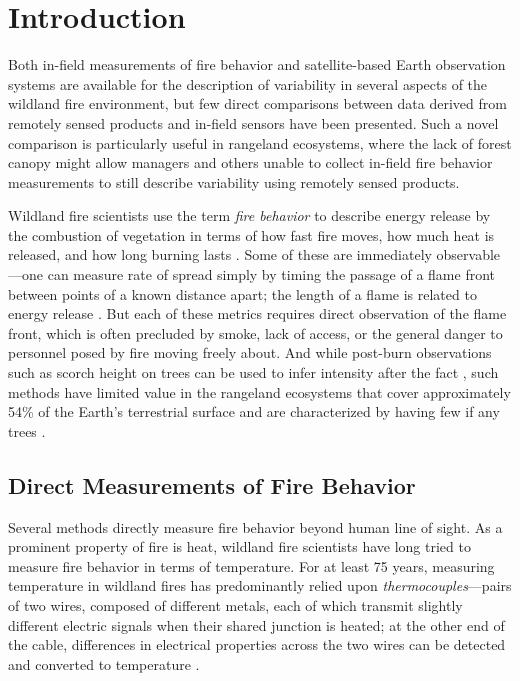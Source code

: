 \documentclass[fire,article,accept,oneauthor,pdftex]{Definitions/mdpi}
\begin{document}
\section{Introduction}

Both in-field measurements of fire behavior and satellite-based Earth observation systems are available for the description of variability in several aspects of the wildland fire environment, but few direct comparisons between data derived from remotely sensed products and in-field sensors have been presented. 
Such a novel comparison is particularly useful in rangeland ecosystems, where the lack of forest canopy might allow managers and others unable to collect in-field fire behavior measurements to still describe variability using remotely sensed products.  

Wildland fire scientists use the term \emph{fire behavior}%
 to describe energy release by the combustion of vegetation in terms of how fast fire moves, how much heat is released, and how long burning lasts \cite{mcgranahan2021a, finney2021}. 
Some of these are immediately observable---one can measure rate of spread simply by timing the passage of a flame front between points of a known distance apart; the length of a flame is related to energy release \cite{rothermel1980}. 
But each of these metrics requires direct observation of the flame front, which is often precluded by smoke, lack of access, or the general danger to personnel posed by fire moving freely about. 
And while post-burn observations such as scorch height on trees can be used to infer intensity after the fact \cite{rothermel1980}, such methods have limited value in the rangeland ecosystems that cover approximately 54\% of the Earth's terrestrial surface and are characterized by having few if any trees \cite{ilri2021}. 

\subsection{Direct Measurements of Fire Behavior} 

Several methods directly measure fire behavior beyond human line of sight. 
As a prominent property of fire is heat, wildland fire scientists have long tried to measure fire behavior in terms of temperature.
For at least 75 years, measuring temperature in wildland fires has predominantly relied upon \emph{thermocouples}---pairs of two wires, composed of different metals, each of which transmit slightly different electric signals when their shared junction is heated; at the other end of the cable, differences in electrical properties across the two wires can be detected and converted to temperature \cite{vaartaja1949, engle1989,mcgranahan2020a, pavlasek2015, shannon2003}. 
\end{document}
